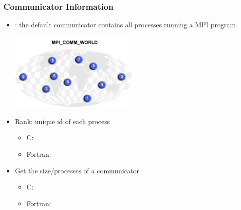 \documentclass[9pt,c]{beamer}
\begin{document}
\begin{frame}[fragile]
  \frametitle{Communicator Information}
  \begin{itemize}
  \item {}: the default communicator contains all processes running a MPI program.
    \begin{center}
      \includegraphics[width=0.5\textwidth]{./comm_world}      
    \end{center}
  \item Rank: unique id of each process
    \begin{itemize}
    \item \textcolor{lubrown}{C:} 
    \item \textcolor{lubrown}{Fortran:} 
    \end{itemize}
  \item Get the size/processes of a communicator
    \begin{itemize}
    \item \textcolor{lubrown}{C:} 
    \item \textcolor{lubrown}{Fortran:} 
    \end{itemize}
  \end{itemize}
\end{frame}
\end{document}
